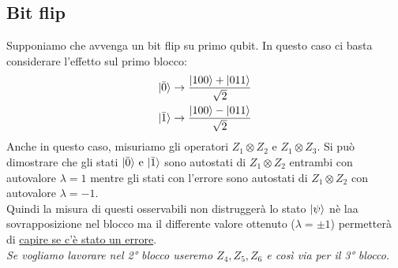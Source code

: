 \documentclass[12pt, a4paper]{report}
\begin{document}
\subsection{Bit flip}
Supponiamo che avvenga un bit flip su primo qubit. In questo caso ci basta considerare l'effetto sul primo blocco:
\begin{equation*}
    \begin{split}
        | \bar{0} \rangle &\rightarrow \frac{| 100 \rangle+| 011 \rangle}{\sqrt{2}}\\
        | \bar{1} \rangle &\rightarrow \frac{| 100 \rangle-| 011 \rangle}{\sqrt{2}}
    \end{split}
\end{equation*}
Anche in questo caso, misuriamo gli operatori $Z_{1}\otimes Z_{2}$ e $Z_{1}\otimes Z_{3}$. Si può dimostrare che gli stati $| \bar{0} \rangle\text{ e }| \bar{1} \rangle$ sono autostati di $Z_{1}\otimes Z_{2}$ entrambi con autovalore $\lambda=1$ mentre gli stati con l'errore sono autostati di $Z_{1}\otimes Z_{2}$ con  autovalore $\lambda=-1$.\\
Quindi la misura di questi osservabili non distruggerà  lo stato $| \psi \rangle$ nè laa sovrapposizione nel blocco ma il differente valore ottenuto ($\lambda=\pm 1$) permetterà di \underline{capire se c'è stato un errore}.\\
\textit{Se vogliamo  lavorare nel 2° blocco useremo $Z_{4},Z_{5},Z_{6}$ e così via per il 3° blocco.}
\end{document}
